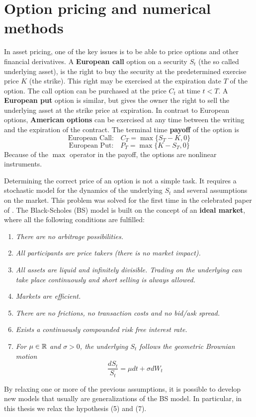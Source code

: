 

\chapter{Option pricing and numerical methods}\label{Chapter2}
\minitoc%

\vspace{5em}


In asset pricing, one of the key issues is to be able to price options and other financial derivatives. 
A \textbf{European call} option on a security $S_t$ (the so called underlying asset), is the right to 
buy the security at the predetermined exercise price $K$ (the strike). This right may be exercised at the expiration date $T$ of the option.
The call option can be purchased at the price $C_t$ at time $t<T$.
A \textbf{European put} option is similar, but gives the owner the right to sell the underlying asset at the strike price at expiration. 
In contrast to European options, \textbf{American options} can be exercised at any time between the writing and the expiration of the contract.
The terminal time \textbf{payoff} of the option is
$$ \mbox{European Call:} \quad C_T = \max \{ S_T - K, 0 \} $$
$$ \mbox{European Put:} \quad P_T = \max \{ K - S_T, 0 \} $$
Because of the $\max$ operator in the payoff, the options are nonlinear instruments. 

Determining the correct price of an option is not a simple task. 
It requires a stochastic model for the dynamics of the underlying $S_t$ and several assumptions on the market.
This problem was solved for the first time in the celebrated paper of \cite{BS73}. 
The Black-Scholes (BS) model is built on the concept of an \textbf{ideal market}, where all the following 
conditions are fulfilled:
\begin{enumerate}
 \item \emph{There are no arbitrage possibilities.}
 \item \emph{All participants are price takers (there is no market impact).}
 \item \emph{All assets are liquid and infinitely divisible. Trading on the underlying can take place continuously and short selling is always allowed.}
 \item \emph{Markets are efficient.}
 \item \emph{There are no frictions, no transaction costs and no bid/ask spread.}
 \item \emph{Exists a continuously compounded risk free interest rate.}
 \item \emph{For $\mu \in \mathbb{R}$ and $\sigma > 0$, the underlying $S_t$ follows the geometric Brownian motion}
	\begin{equation}\label{GBM2}
	  \frac{dS_t}{S_t} = \mu dt + \sigma dW_t
	\end{equation}
\end{enumerate}
By relaxing one or more of the previous assumptions, it is possible to develop new models that usually are generalizations of the BS model.
In particular, in this thesis we relax the hypothesis (5) and (7). 


